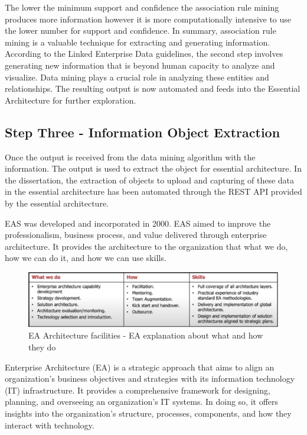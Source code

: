 \documentclass{article}
\begin{document}
The lower the minimum support and confidence the association rule mining produces more information however it is more computationally intensive to use the lower number for support and confidence.
In summary, association rule mining is a valuable technique for extracting and generating information. According to the Linked Enterprise Data guidelines, the second step involves generating new information that is beyond human capacity to analyze and visualize. Data mining plays a crucial role in analyzing these entities and relationships. The resulting output is now automated and feeds into the Essential Architecture for further exploration.

\maketitle
\subsection{Step Three - Information Object Extraction}

Once the output is received from the data mining algorithm with the information. The output is used to extract the object for essential architecture. In the dissertation, the extraction of objects to upload and capturing of these data in the essential architecture has been automated through the REST API provided by the essential architecture.

EAS was developed and incorporated in 2000. EAS aimed to improve the professionalism, business process, and value delivered through enterprise architecture. It provides the architecture to the organization that what we do, how we can do it, and how we can use skills. 

\begin{figure}[ht!]
    \centering
    \includegraphics[scale=0.8]{ea-what-how-skills}
    \caption{EA Architecture facilities - 
EA explanation about what and how they do}
    \label{fig:ea-facilities}
\end{figure}

Enterprise Architecture (EA) is a strategic approach that aims to align an organization's business objectives and strategies with its information technology (IT) infrastructure. It provides a comprehensive framework for designing, planning, and overseeing an organization's IT systems. In doing so, it offers insights into the organization's structure, processes, components, and how they interact with technology.
\end{document}
